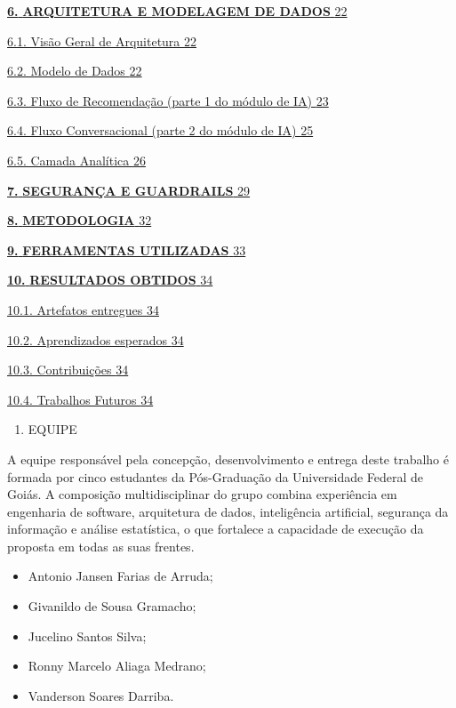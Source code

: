 \documentclass[
]{article}
\begin{document}
\hyperref[_Toc230227824]{\textbf{6.} \textbf{ARQUITETURA E MODELAGEM DE
DADOS} \hyperref[_Toc230227824]{22}}

\hyperref[_Toc230227825]{6.1. Visão Geral de Arquitetura
\hyperref[_Toc230227825]{22}}

\hyperref[_Toc230227826]{6.2. Modelo de Dados
\hyperref[_Toc230227826]{22}}

\hyperref[_Toc230227827]{6.3. Fluxo de Recomendação (parte 1 do módulo
de IA) \hyperref[_Toc230227827]{23}}

\hyperref[_Toc230227828]{6.4. Fluxo Conversacional (parte 2 do módulo de
IA) \hyperref[_Toc230227828]{25}}

\hyperref[_Toc230227829]{6.5. Camada Analítica
\hyperref[_Toc230227829]{26}}

\hyperref[_Toc230227830]{\textbf{7.} \textbf{SEGURANÇA E GUARDRAILS}
\hyperref[_Toc230227830]{29}}

\hyperref[_Toc230227831]{\textbf{8.} \textbf{METODOLOGIA}
\hyperref[_Toc230227831]{32}}

\hyperref[_Toc230227832]{\textbf{9.} \textbf{FERRAMENTAS UTILIZADAS}
\hyperref[_Toc230227832]{33}}

\hyperref[_Toc230227833]{\textbf{10.} \textbf{RESULTADOS OBTIDOS}
\hyperref[_Toc230227833]{34}}

\hyperref[_Toc230227834]{10.1. Artefatos entregues
\hyperref[_Toc230227834]{34}}

\hyperref[_Toc230227835]{10.2. Aprendizados esperados
\hyperref[_Toc230227835]{34}}

\hyperref[_Toc230227836]{10.3. Contribuições
\hyperref[_Toc230227836]{34}}

\hyperref[_Toc230227837]{10.4. Trabalhos Futuros
\hyperref[_Toc230227837]{34}}

\begin{enumerate}
\def\labelenumi{\arabic{enumi}.}
\item
  \protect{}\label{_Toc230227800}{}EQUIPE
\end{enumerate}

A equipe responsável pela concepção, desenvolvimento e entrega deste
trabalho é formada por cinco estudantes da Pós-Graduação da Universidade
Federal de Goiás. A composição multidisciplinar do grupo combina
experiência em engenharia de software, arquitetura de dados,
inteligência artificial, segurança da informação e análise estatística,
o que fortalece a capacidade de execução da proposta em todas as suas
frentes.

\begin{itemize}
\item
  Antonio Jansen Farias de Arruda;
\item
  Givanildo de Sousa Gramacho;
\item
  Jucelino Santos Silva;
\item
  Ronny Marcelo Aliaga Medrano;
\item
  Vanderson Soares Darriba.
\end{itemize}
\end{document}
